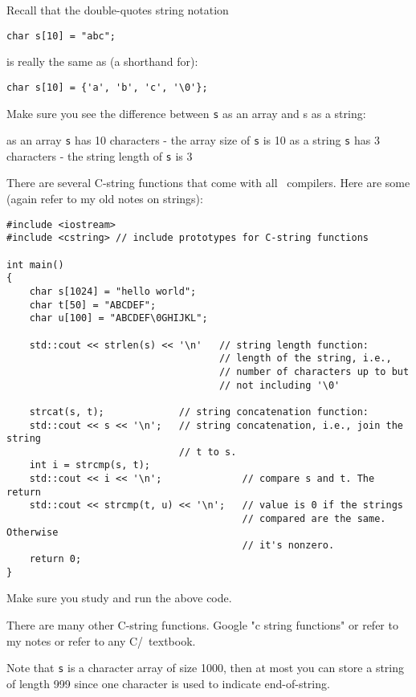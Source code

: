 Recall that the double-quotes string notation
{\small
\begin{Verbatim}[frame=single, commandchars = \~\@\!]
char s[10] = "abc";
\end{Verbatim}
}
is really the same as (a shorthand for):
{\small
\begin{Verbatim}[frame=single, commandchars = \~\@\!]
char s[10] = {'a', 'b', 'c', '\0'};
\end{Verbatim}
}
Make sure you see the difference between \verb!s! as an array and s as a string:
\begin{tightlist}
 \li as an array \verb!s! has 10 characters - the array size of \verb!s! is 10
 \li as a string \verb!s! has 3 characters - the string length of \verb!s! is 3
\end{tightlist}

There are several C-string functions that come with all \cpp\ compilers.
Here are some (again refer to
my old notes on strings):
{\small
\begin{Verbatim}[frame=single, commandchars=\~\@\!]
#include <iostream>
#include <cstring> // include prototypes for C-string functions

int main()
{
    char s[1024] = "hello world";
    char t[50] = "ABCDEF";
    char u[100] = "ABCDEF\0GHIJKL";

    std::cout << strlen(s) << '\n'   // string length function:
                                     // length of the string, i.e.,
                                     // number of characters up to but
                                     // not including '\0'

    strcat(s, t);             // string concatenation function:
    std::cout << s << '\n';   // string concatenation, i.e., join the string
                              // t to s.
    int i = strcmp(s, t);
    std::cout << i << '\n';              // compare s and t. The return
    std::cout << strcmp(t, u) << '\n';   // value is 0 if the strings
                                         // compared are the same. Otherwise
                                         // it's nonzero.
    return 0;
}
\end{Verbatim}
}
Make sure you study and run the above code.

There are many other C-string functions. Google "c string functions" or
refer to my notes or refer to any
C/\cpp\ textbook.

Note that \verb!s! is a character array of size 1000, then at most you
can store a string of length 999 since
one character is used to indicate end-of-string.

